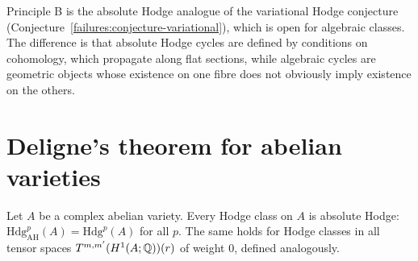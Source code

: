\begin{remark}\label{absolute-hodge:remark-variational}
Principle B is the absolute Hodge analogue of the variational Hodge conjecture (Conjecture~\ref{failures:conjecture-variational}), which is open for algebraic classes. The difference is that absolute Hodge
cycles are defined by conditions on cohomology, which propagate along flat sections, while algebraic cycles are geometric objects whose existence on one fibre does not obviously imply existence on the
others.
\end{remark}

\section{Deligne's theorem for abelian varieties}\label{absolute-hodge:section-deligne}

\begin{theorem}[Deligne]\label{absolute-hodge:theorem-deligne}
Let $A$ be a complex abelian variety. Every Hodge class on $A$ is absolute Hodge: $\mathrm{Hdg}^p_{\mathrm{AH}}(A) = \mathrm{Hdg}^p(A)$ for all $p$. The same holds for Hodge classes in all tensor spaces
$T^{m,m'}(H^1(A; \mathbb{Q}))(r)$ of weight $0$, defined analogously.
\end{theorem}

